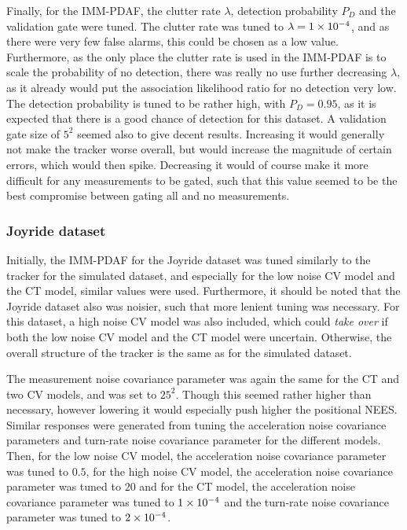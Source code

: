 Finally, for the IMM-PDAF, the clutter rate $\lambda$, detection probability $P_D$ and the validation gate were tuned. The clutter rate was tuned to $\lambda = {1} \times 10^{-4}$, and as there were very few false alarms, this could be chosen as a low value. Furthermore, as the only place the clutter rate is used in the IMM-PDAF is to scale the probability of no detection, there was really no use further decreasing $\lambda$, as it already would put the association likelihood ratio for no detection very low. The detection probability is tuned to be rather high, with $P_D = 0.95$, as it is expected that there is a good chance of detection for this dataset. A validation gate size of $5^2$ seemed also to give decent results. Increasing it would generally not make the tracker worse overall, but would increase the magnitude of certain errors, which would then spike. Decreasing it would of course make it more difficult for any measurements to be gated, such that this value seemed to be the best compromise between gating all and no measurements. 

\subsubsection*{Joyride dataset}
Initially, the IMM-PDAF for the Joyride dataset was tuned similarly to the tracker for the simulated dataset, and especially for the low noise CV model and the CT model, similar values were used. Furthermore, it should be noted that the Joyride dataset also was noisier, such that more lenient tuning was necessary. For this dataset, a high noise CV model was also included, which could \textit{take over} if both the low noise CV model and the CT model were uncertain. Otherwise, the overall structure of the tracker is the same as for the simulated dataset. 

The measurement noise covariance parameter was again the same for the CT and two CV models, and was set to $25^2$. Though this seemed rather higher than necessary, however lowering it would especially push higher the positional NEES. Similar responses were generated from tuning the acceleration noise covariance parameters and turn-rate noise covariance parameter for the different models. Then, for the low noise CV model, the acceleration noise covariance parameter was tuned to $0.5$, for the high noise CV model, the acceleration noise covariance parameter was tuned to $20$ and for the CT model, the acceleration noise covariance parameter was tuned to ${1} \times 10^{-4}$ and the turn-rate noise covariance parameter was tuned to ${2} \times 10^{-4}$. 

